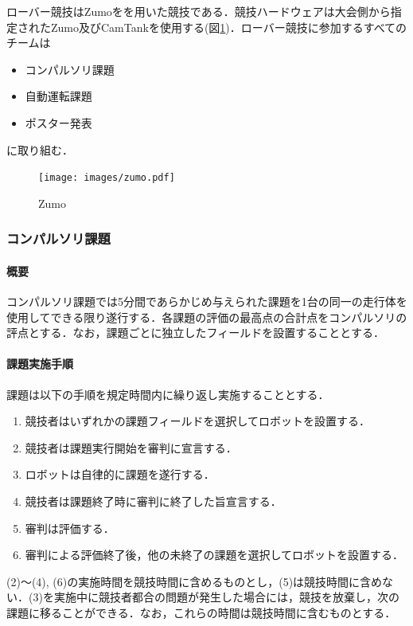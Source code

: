 \documentclass[submit]{ipsj}
\begin{document}
ローバー競技はZumoをを用いた競技である．競技ハードウェアは大会側から指定されたZumo及びCamTankを使用する(図\ref{fig:zumo})．ローバー競技に参加するすべてのチームは
\begin{itemize}
\item コンパルソリ課題
\item 自動運転課題
\item ポスター発表
\end{itemize}
に取り組む．

\begin{figure}[bt]
\centering
\texttt{[image: images/zumo.pdf]}
\caption{Zumo} 
\label{fig:zumo}
\end{figure}

\subsubsection{コンパルソリ課題}

\paragraph*{概要}
コンパルソリ課題では5分間であらかじめ与えられた課題を1台の同一の走行体を使用してできる限り遂行する．各課題の評価の最高点の合計点をコンパルソリの評点とする．なお，課題ごとに独立したフィールドを設置することとする．

\paragraph*{課題実施手順}
課題は以下の手順を規定時間内に繰り返し実施することとする．
\begin{enumerate}
\item 競技者はいずれかの課題フィールドを選択してロボットを設置する．
\item 競技者は課題実行開始を審判に宣言する．
\item ロボットは自律的に課題を遂行する．
\item 競技者は課題終了時に審判に終了した旨宣言する．
\item 審判は評価する．
\item 審判による評価終了後，他の未終了の課題を選択してロボットを設置する．
\end{enumerate}

(2)〜(4), (6)の実施時間を競技時間に含めるものとし，(5)は競技時間に含めない．(3)を実施中に競技者都合の問題が発生した場合には，競技を放棄し，次の課題に移ることができる．なお，これらの時間は競技時間に含むものとする．
\end{document}
